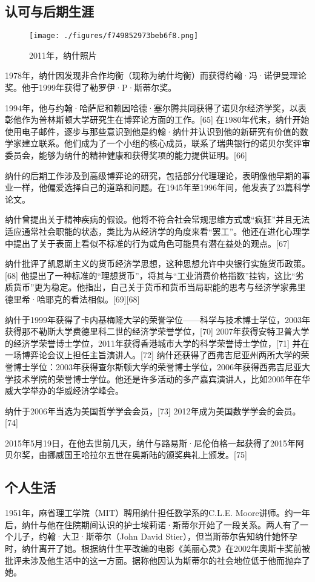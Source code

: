 \subsection{认可与后期生涯}
\begin{figure}[ht]
\centering
\texttt{[image: ./figures/f749852973beb6f8.png]}
\caption{2011年，纳什照片} \label{fig_JFNJY_3}
\end{figure}
1978年，纳什因发现非合作均衡（现称为纳什均衡）而获得约翰·冯·诺伊曼理论奖。他于1999年获得了勒罗伊·P·斯蒂尔奖。

1994年，他与约翰·哈萨尼和赖因哈德·塞尔腾共同获得了诺贝尔经济学奖，以表彰他作为普林斯顿大学研究生在博弈论方面的工作。[65] 在1980年代末，纳什开始使用电子邮件，逐步与那些意识到他是约翰·纳什并认识到他的新研究有价值的数学家建立联系。他们成为了一个小组的核心成员，联系了瑞典银行的诺贝尔奖评审委员会，能够为纳什的精神健康和获得奖项的能力提供证明。[66]

纳什的后期工作涉及到高级博弈论的研究，包括部分代理理论，表明像他早期的事业一样，他偏爱选择自己的道路和问题。在1945年至1996年间，他发表了23篇科学论文。

纳什曾提出关于精神疾病的假设。他将不符合社会常规思维方式或“疯狂”并且无法适应通常社会职能的状态，类比为从经济学的角度来看“罢工”。他还在进化心理学中提出了关于表面上看似不标准的行为或角色可能具有潜在益处的观点。[67]

纳什批评了凯恩斯主义的货币经济学思想，这种思想允许中央银行实施货币政策。[68] 他提出了一种标准的“理想货币”，将其与“工业消费价格指数”挂钩，这比“劣质货币”更为稳定。他指出，自己关于货币和货币当局职能的思考与经济学家弗里德里希·哈耶克的看法相似。[69][68]

纳什于1999年获得了卡内基梅隆大学的荣誉学位——科学与技术博士学位，2003年获得那不勒斯大学费德里科二世的经济学荣誉学位，[70] 2007年获得安特卫普大学的经济学荣誉博士学位，2011年获得香港城市大学的科学荣誉博士学位，[71] 并在一场博弈论会议上担任主旨演讲人。[72] 纳什还获得了西弗吉尼亚州两所大学的荣誉博士学位：2003年获得查尔斯顿大学的荣誉博士学位，2006年获得西弗吉尼亚大学技术学院的荣誉博士学位。他还是许多活动的多产嘉宾演讲人，比如2005年在华威大学举办的华威经济学峰会。

纳什于2006年当选为美国哲学学会会员，[73] 2012年成为美国数学学会的会员。[74]

2015年5月19日，在他去世前几天，纳什与路易斯·尼伦伯格一起获得了2015年阿贝尔奖，由挪威国王哈拉尔五世在奥斯陆的颁奖典礼上颁发。[75]
\subsection{个人生活}  
1951年，麻省理工学院（MIT）聘用纳什担任数学系的C.L.E. Moore讲师。约一年后，纳什与他在住院期间认识的护士埃莉诺·斯蒂尔开始了一段关系。两人有了一个儿子，约翰·大卫·斯蒂尔（John David Stier），但当斯蒂尔告知纳什她怀孕时，纳什离开了她。根据纳什生平改编的电影《美丽心灵》在2002年奥斯卡奖前被批评未涉及他生活中的这一方面。据称他因认为斯蒂尔的社会地位低于他而抛弃了她。


